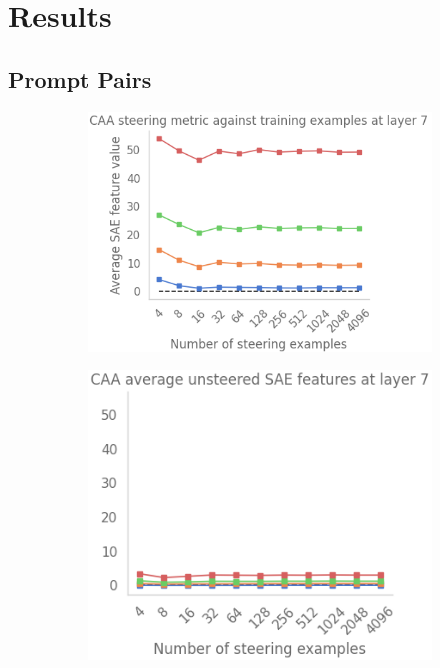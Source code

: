 \chapter{Results}

\section{Prompt Pairs}

\begin{figure}
    \centering
    \captionsetup{width=.9\textwidth}
    \begin{subfigure}{0.52\textwidth}
        \includegraphics[width=\textwidth]{figures/prompt_pairs_caa_1.png}
        \caption{ }
    \end{subfigure}
    \begin{subfigure}{0.43\textwidth}
        \includegraphics[width=\textwidth]{figures/prompt_pairs_caa_2.png}

\end{subfigure}
\end{figure}
